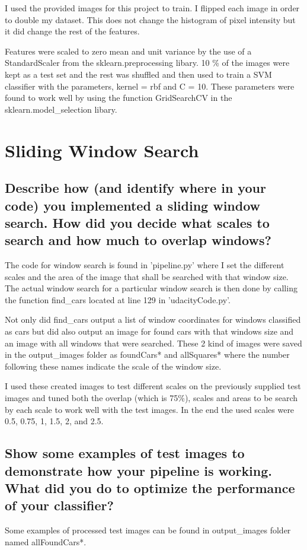 \documentclass[12pt,a4paper]{article}
\begin{document}
I used the provided images for this project to train. I flipped each image in order to double my dataset. This does not change the histogram of pixel intensity but it did change the rest of the features.

Features were scaled to zero mean and unit variance by the use of a StandardScaler from the sklearn.preprocessing libary. 10 \% of the images were kept as a test set and the rest was shuffled and then used to train a SVM classifier with the parameters, kernel = rbf and C = 10. These parameters were found to work well by using the function GridSearchCV in the sklearn.model\_selection libary. 

\section{Sliding Window Search}
\subsection{Describe how (and identify where in your code) you implemented a sliding window search. How did you decide what scales to search and how much to overlap windows?}
The code for window search is found in 'pipeline.py' where I set the different scales and the area of the image that shall be searched with that window size. The actual window search for a particular window search is then done by calling the function find\_cars located at line 129 in 'udacityCode.py'.

Not only did find\_cars output a list of window coordinates for windows classified as cars but did also output an image for found cars with that windows size and an image with all windows that were searched. These 2 kind of images were saved in the output\_images folder as foundCars* and allSquares* where the number following these names indicate the scale of the window size.

I used these created images to test different scales on the previously supplied test images and tuned both the overlap (which is 75\%), scales and areas to be search by each scale to work well with the test images. In the end the used scales were 0.5, 0.75, 1, 1.5, 2, and 2.5.

\subsection{Show some examples of test images to demonstrate how your pipeline is working. What did you do to optimize the performance of your classifier?}
Some examples of processed test images can be found in output\_images folder named allFoundCars*. 
\end{document}
